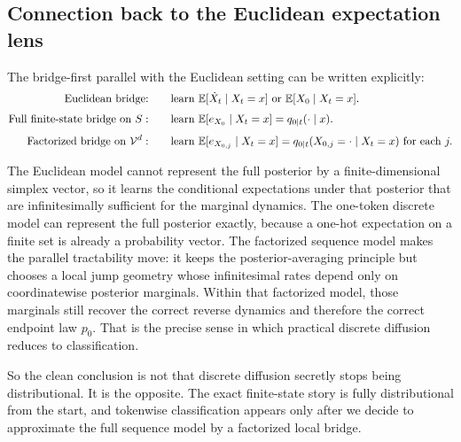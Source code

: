 \documentclass[11pt]{article}
\begin{document}
\subsection{Connection back to the Euclidean expectation lens}
\label{subsec:euclidean-connection}

The bridge-first parallel with the Euclidean setting can be written explicitly:
\[
  \begin{aligned}
    \text{Euclidean bridge:}\qquad
    &\text{learn }
    \mathbb{E}[\dot X_t\mid X_t=x]
    \text{ or }
    \mathbb{E}[X_0\mid X_t=x].\\[0.35em]
    \text{Full finite-state bridge on }S:\qquad
    &\text{learn }
    \mathbb{E}[e_{X_0}\mid X_t=x]
    =
    q_{0\mid t}(\cdot\mid x).\\[0.35em]
    \text{Factorized bridge on }\mathcal{V}^d:\qquad
    &\text{learn }
    \mathbb{E}[e_{X_{0,j}}\mid X_t=x]
    =
    q_{0\mid t}(X_{0,j}=\cdot\mid X_t=x)
    \text{ for each }j.
  \end{aligned}
\]

The Euclidean model cannot represent the full posterior by a finite-dimensional simplex vector, so it learns the conditional expectations under that posterior that are infinitesimally sufficient for the marginal dynamics.
The one-token discrete model can represent the full posterior exactly, because a one-hot expectation on a finite set is already a probability vector.
The factorized sequence model makes the parallel tractability move: it keeps the posterior-averaging principle but chooses a local jump geometry whose infinitesimal rates depend only on coordinatewise posterior marginals.
Within that factorized model, those marginals still recover the correct reverse dynamics and therefore the correct endpoint law \(p_0\).
That is the precise sense in which practical discrete diffusion reduces to classification.

So the clean conclusion is not that discrete diffusion secretly stops being distributional.
It is the opposite.
The exact finite-state story is fully distributional from the start, and tokenwise classification appears only after we decide to approximate the full sequence model by a factorized local bridge.
\end{document}

